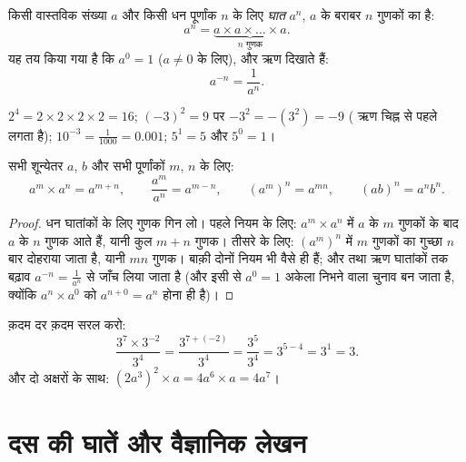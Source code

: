 \begin{definition}[घात]\label{def:g9:fractions:power}
किसी वास्तविक संख्या $a$ और किसी धन पूर्णांक $n$ के लिए
\emph{घात} $a^n$, $a$ के बराबर $n$ गुणकों का  है:
\[
a^n = \underbrace{a \times a \times \dots \times a}_{n \text{ गुणक}} .
\]
यह तय किया गया है कि $a^0 = 1$ ($a \neq 0$ के लिए), और ऋण 
 दिखाते हैं:
\[
a^{-n} = \frac{1}{a^n}.
\]
\end{definition}

\begin{example}
$2^4 = 2 \times 2 \times 2 \times 2 = 16$; \quad
$(-3)^2 = 9$ पर $-3^2 = -(3^2) = -9$ ( ऋण चिह्न से पहले लगता
है); \quad $10^{-3} = \frac{1}{1000} = 0.001$; \quad
$5^1 = 5$ और $5^0 = 1$।
\end{example}

\begin{theorem}[घातांक के नियम]\label{thm:g9:fractions:rules}
सभी शून्येतर $a$, $b$ और सभी पूर्णांकों $m$, $n$ के लिए:
\[
a^m \times a^n = a^{m+n},
\qquad
\frac{a^m}{a^n} = a^{m-n},
\qquad
\left(a^m\right)^n = a^{mn},
\qquad
(ab)^n = a^n b^n .
\]
\end{theorem}

\begin{proof}
धन घातांकों के लिए गुणक गिन लो। पहले नियम के लिए:
$a^m \times a^n$ में $a$ के $m$ गुणकों के बाद $a$ के $n$ गुणक आते
हैं, यानी कुल $m + n$ गुणक। तीसरे के लिए:
$\left(a^m\right)^n$ में $m$ गुणकों का गुच्छा $n$ बार दोहराया जाता
है, यानी $mn$ गुणक। बाक़ी दोनों नियम भी वैसे ही हैं; और  तथा ऋण
घातांकों तक बढ़ाव $a^{-n} = \frac{1}{a^n}$ से जाँच लिया जाता है (और
इसी से $a^0 = 1$ अकेला निभने वाला चुनाव बन जाता है, क्योंकि
$a^n \times a^0$ को $a^{n+0} = a^n$ होना ही है)।
\end{proof}

\begin{example}\label{ex:g9:fractions:rules}
क़दम दर क़दम सरल करो:
\[
\frac{3^7 \times 3^{-2}}{3^4}
= \frac{3^{7 + (-2)}}{3^4}
= \frac{3^5}{3^4}
= 3^{5-4} = 3^1 = 3 .
\]
और दो अक्षरों के साथ: $(2a^3)^2 \times a = 4 a^6 \times a = 4a^7$।
\end{example}

\section{दस की घातें और वैज्ञानिक लेखन}

